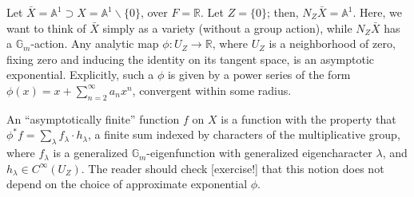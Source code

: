 \begin{example}
 \label{example-real-asymptotics-baby}
Let $\bar X = \mathbb A^1 \supset X=\mathbb A^1\smallsetminus\{0\}$, over $F=\mathbb R$. Let $Z=\{0\}$; then, $N_Z \bar X = \mathbb A^1$. Here, we want to think of $\bar X$ simply as a variety (without a group action), while $N_Z \bar X$ has a $\mathbb G_m$-action. Any analytic map $\phi: U_Z\to \mathbb R$, where $U_Z$ is a neighborhood of zero, fixing zero and inducing the identity on its tangent space, is an asymptotic exponential. Explicitly, such a $\phi$ is given by a power series of the form $\phi(x) = x + \sum_{n=2}^\infty a_n x^n$, convergent within some radius. 

An ``asymptotically finite'' function $f$ on $X$ is a function with the property that $\phi^* f = \sum_\lambda f_\lambda \cdot h_\lambda$, a finite sum indexed by characters of the multiplicative group, where $f_\lambda$ is a generalized $\mathbb G_m$-eigenfunction with generalized eigencharacter $\lambda$, and $h_\lambda \in C^\infty(U_Z)$. The reader should check [exercise!] that this notion does not depend on the choice of approximate exponential $\phi$.
\end{example}

